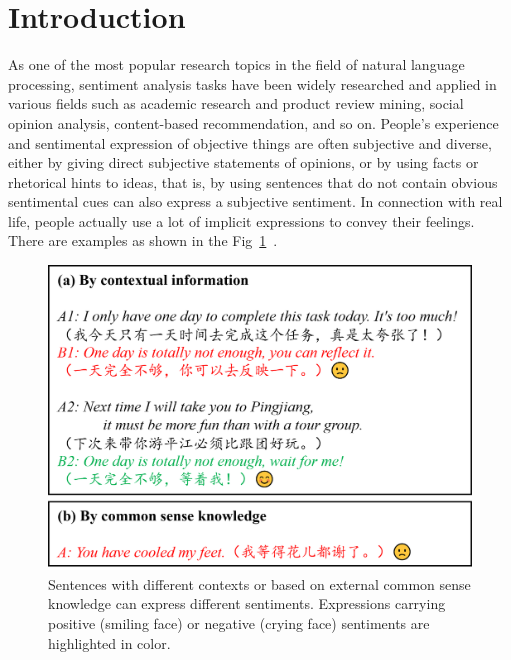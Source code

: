 \section{Introduction}

As one of the most popular research topics in the field of natural language processing, sentiment analysis tasks have been widely researched and applied in various fields such as academic research and product review mining, social opinion analysis, content-based recommendation, and so on.
People's experience and sentimental expression of objective things are often subjective and diverse, either by giving direct subjective statements of opinions, or by using facts or rhetorical hints to ideas, that is, by using sentences that do not contain obvious sentimental cues can also express a subjective sentiment. In connection with real life, people actually use a lot of implicit expressions to convey their feelings. There are examples as shown in the Fig~\ref{fig:Example}~.

\begin{figure}[h]
    \centering
    \includegraphics[width=0.5\linewidth]{submissions/knowledge-sentiment-analysis/2.png}
    \caption{Sentences with different contexts or based on external common sense knowledge can express different sentiments. Expressions carrying positive (smiling face) or negative (crying face) sentiments are highlighted in color. }
    \label{fig:Example}
\end{figure}

